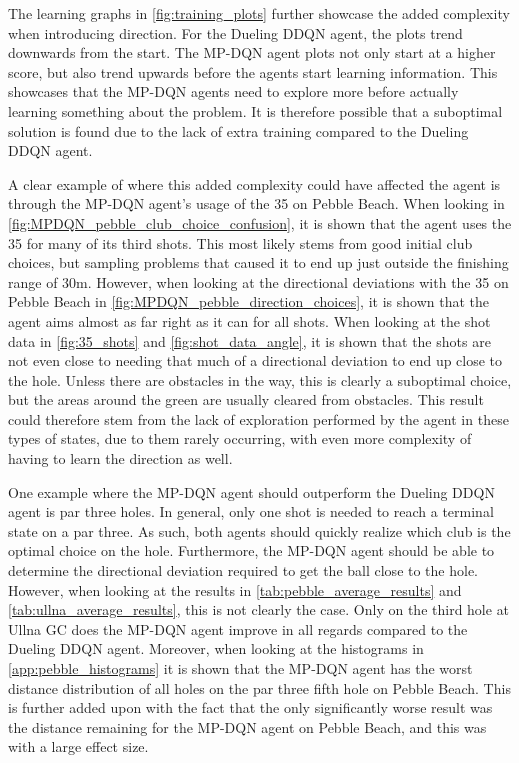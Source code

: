 \documentclass{kththesis}
\begin{document}
The learning graphs in \autoref{fig:training_plots} further showcase the added complexity when introducing direction. For the Dueling DDQN agent, the plots trend downwards from the start. The MP-DQN agent plots not only start at a higher score, but also trend upwards before the agents start learning information. This showcases that the MP-DQN agents need to explore more before actually learning something about the problem. It is therefore possible that a suboptimal solution is found due to the lack of extra training compared to the Dueling DDQN agent.

A clear example of where this added complexity could have affected the agent is through the MP-DQN agent's usage of the 35 on Pebble Beach. When looking in \autoref{fig:MPDQN_pebble_club_choice_confusion}, it is shown that the agent uses the 35 for many of its third shots. This most likely stems from good initial club choices, but sampling problems that caused it to end up just outside the finishing range of 30m. However, when looking at the directional deviations with the 35 on Pebble Beach in \autoref{fig:MPDQN_pebble_direction_choices}, it is shown that the agent aims almost as far right as it can for all shots. When looking at the shot data in \autoref{fig:35_shots} and \autoref{fig:shot_data_angle}, it is shown that the shots are not even close to needing that much of a directional deviation to end up close to the hole. Unless there are obstacles in the way, this is clearly a suboptimal choice, but the areas around the green are usually cleared from obstacles. This result could therefore stem from the lack of exploration performed by the agent in these types of states, due to them rarely occurring, with even more complexity of having to learn the direction as well. 

One example where the MP-DQN agent should outperform the Dueling DDQN agent is par three holes. In general, only one shot is needed to reach a terminal state on a par three. As such, both agents should quickly realize which club is the optimal choice on the hole. Furthermore, the MP-DQN agent should be able to determine the directional deviation required to get the ball close to the hole. However, when looking at the results in \autoref{tab:pebble_average_results} and \autoref{tab:ullna_average_results}, this is not clearly the case. Only on the third hole at Ullna GC does the MP-DQN agent improve in all regards compared to the Dueling DDQN agent. Moreover, when looking at the histograms in \autoref{app:pebble_histograms} it is shown that the MP-DQN agent has the worst distance distribution of all holes on the par three fifth hole on Pebble Beach. This is further added upon with the fact that the only significantly worse result was the distance remaining for the MP-DQN agent on Pebble Beach, and this was with a large effect size. 
\end{document}
